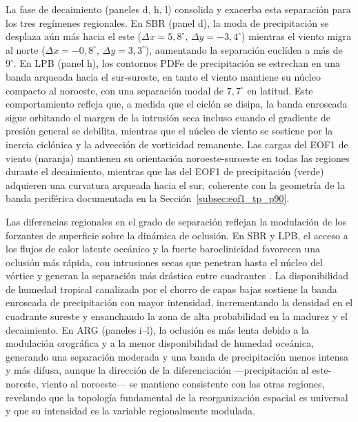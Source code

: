 La fase de decaimiento (paneles d, h, l) consolida y exacerba esta separación para los tres regímenes regionales. En SBR (panel d), la moda de precipitación se desplaza aún más hacia el este ($\Delta x = 5{,}8^{\circ}$, $\Delta y = -3{,}4^{\circ}$) mientras el viento migra al norte ($\Delta x = -0{,}8^{\circ}$, $\Delta y = 3{,}3^{\circ}$), aumentando la separación euclídea a más de $9^{\circ}$. En LPB (panel h), los contornos PDFe de precipitación se estrechan en una banda arqueada hacia el sur-sureste, en tanto el viento mantiene su núcleo compacto al noroeste, con una separación modal de $7{,}7^{\circ}$ en latitud. Este comportamiento refleja que, a medida que el ciclón se disipa, la banda enroscada sigue orbitando el margen de la intrusión seca incluso cuando el gradiente de presión general se debilita, mientras que el núcleo de viento se sostiene por la inercia ciclónica y la advección de vorticidad remanente. Las cargas del EOF1 de viento (naranja) mantienen su orientación noroeste-suroeste en todas las regiones durante el decaimiento, mientras que las del EOF1 de precipitación (verde) adquieren una curvatura arqueada hacia el sur, coherente con la geometría de la banda periférica documentada en la Sección~\ref{subsec:eof1_tp_p90}.

Las diferencias regionales en el grado de separación reflejan la modulación de los forzantes de superficie sobre la dinámica de oclusión. En SBR y LPB, el acceso a los flujos de calor latente oceánico y la fuerte baroclinicidad favorecen una oclusión más rápida, con intrusiones secas que penetran hasta el núcleo del vórtice y generan la separación más drástica entre cuadrantes \citep{gozzo2013air}. La disponibilidad de humedad tropical canalizada por el chorro de capas bajas \citep{gramcianinov2024early} sostiene la banda enroscada de precipitación con mayor intensidad, incrementando la densidad en el cuadrante sureste y ensanchando la zona de alta probabilidad en la madurez y el decaimiento. En ARG (paneles i--l), la oclusión es más lenta debido a la modulación orográfica y a la menor disponibilidad de humedad oceánica, generando una separación moderada y una banda de precipitación menos intensa y más difusa, aunque la dirección de la diferenciación —precipitación al este-noreste, viento al noroeste— se mantiene consistente con las otras regiones, revelando que la topología fundamental de la reorganización espacial es universal y que su intensidad es la variable regionalmente modulada.


